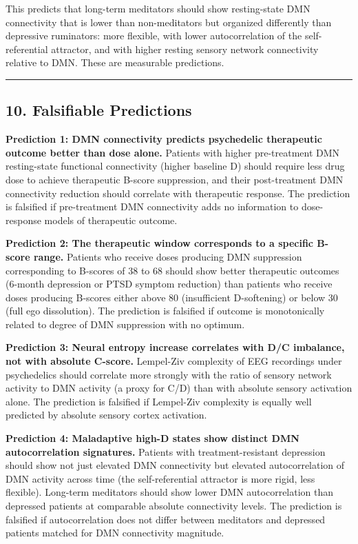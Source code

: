 \documentclass[
  11pt,
  letterpaper,
]{article}
\begin{document}
This predicts that long-term meditators should show resting-state DMN
connectivity that is lower than non-meditators but organized differently
than depressive ruminators: more flexible, with lower autocorrelation of
the self-referential attractor, and with higher resting sensory network
connectivity relative to DMN. These are measurable predictions.

\begin{center}\rule{0.5\linewidth}{0.5pt}\end{center}

\subsection{10. Falsifiable Predictions}\label{falsifiable-predictions}

\textbf{Prediction 1: DMN connectivity predicts psychedelic therapeutic
outcome better than dose alone.} Patients with higher pre-treatment DMN
resting-state functional connectivity (higher baseline D) should require
less drug dose to achieve therapeutic B-score suppression, and their
post-treatment DMN connectivity reduction should correlate with
therapeutic response. The prediction is falsified if pre-treatment DMN
connectivity adds no information to dose-response models of therapeutic
outcome.

\textbf{Prediction 2: The therapeutic window corresponds to a specific
B-score range.} Patients who receive doses producing DMN suppression
corresponding to B-scores of 38 to 68 should show better therapeutic
outcomes (6-month depression or PTSD symptom reduction) than patients
who receive doses producing B-scores either above 80 (insufficient
D-softening) or below 30 (full ego dissolution). The prediction is
falsified if outcome is monotonically related to degree of DMN
suppression with no optimum.

\textbf{Prediction 3: Neural entropy increase correlates with D/C
imbalance, not with absolute C-score.} Lempel-Ziv complexity of EEG
recordings under psychedelics should correlate more strongly with the
ratio of sensory network activity to DMN activity (a proxy for C/D) than
with absolute sensory activation alone. The prediction is falsified if
Lempel-Ziv complexity is equally well predicted by absolute sensory
cortex activation.

\textbf{Prediction 4: Maladaptive high-D states show distinct DMN
autocorrelation signatures.} Patients with treatment-resistant
depression should show not just elevated DMN connectivity but elevated
autocorrelation of DMN activity across time (the self-referential
attractor is more rigid, less flexible). Long-term meditators should
show lower DMN autocorrelation than depressed patients at comparable
absolute connectivity levels. The prediction is falsified if
autocorrelation does not differ between meditators and depressed
patients matched for DMN connectivity magnitude.
\end{document}
